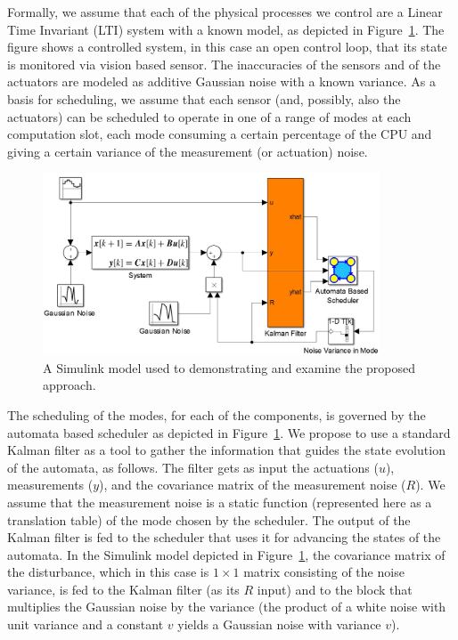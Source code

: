 \documentclass[ twoside, 12pt ]{article}
\begin{document}
Formally, we assume that each of the physical processes we control are a Linear Time Invariant (LTI) system with a known model, as depicted in Figure~\ref{fig:simulink}. 
The figure shows a controlled system, in this case an open control loop, that its state is monitored via vision based sensor. 
The inaccuracies of the sensors and of the actuators are modeled as additive Gaussian noise with a known variance. As a basis for scheduling, we assume that each sensor (and, possibly, also the actuators) can be scheduled to operate in one of a range of modes at each computation slot, each mode consuming a certain percentage of the CPU and giving a certain variance of the measurement (or actuation) noise.

\begin{figure}%
    \centerline{\includegraphics[width=100mm]{SimulinkModel.jpg}}
    \caption{A Simulink model used to demonstrating and  examine the proposed approach.}
    \label{fig:simulink}
\end{figure}

The scheduling of the modes, for each of the components, is governed by the automata based scheduler as depicted in Figure~\ref{fig:simulink}. We propose to use a standard Kalman filter as a tool to gather the information that guides the state evolution of the automata, as follows. The filter gets as input the actuations ($u$),  measurements ($y$), and the covariance matrix of the measurement noise ($R$). We assume that the measurement noise is a static function (represented here as a translation table) of the mode chosen by the scheduler. The output of the Kalman filter is fed to the scheduler that uses it for advancing the states of the automata. 
In the Simulink model depicted in Figure~\ref{fig:simulink}, the covariance matrix of the disturbance, which in this case is $1 \times 1$ matrix consisting of the noise variance, is fed to the Kalman filter (as its $R$ input) and to the block that multiplies the Gaussian noise by the variance (the product of a white noise with unit variance and a constant $v$ yields a Gaussian noise with variance $v$).
\end{document}

